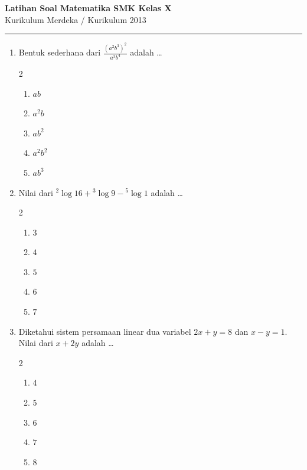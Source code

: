 \documentclass[12pt,a4paper]{article}
\begin{document}
\begin{center}
    \Large \textbf{\textsf{Latihan Soal Matematika SMK Kelas X}}\\
    \normalsize \textsf{Kurikulum Merdeka / Kurikulum 2013}
    \vspace{0.2cm}\\
    \rule{0.8\textwidth}{0.8pt}
\end{center}
\vspace{0.5cm}

\begin{enumerate}[itemsep=2ex]
    \item Bentuk sederhana dari $\displaystyle \frac{(a^2 b^3)^2}{a^3 b^4}$ adalah \dots
    \begin{multicols}{2}
    \begin{enumerate}[label=\Alph*.]
        \item $a b$
        \item $a^2 b$
        \item $a b^2$
        \item $a^2 b^2$
        \item $a b^3$
    \end{enumerate}
    \end{multicols}

    \item Nilai dari ${}^2\log 16 + {}^3\log 9 - {}^5\log 1$ adalah \dots
    \begin{multicols}{2}
    \begin{enumerate}[label=\Alph*.]
        \item $3$
        \item $4$
        \item $5$
        \item $6$
        \item $7$
    \end{enumerate}
    \end{multicols}

    \item Diketahui sistem persamaan linear dua variabel $2x + y = 8$ dan $x - y = 1$. Nilai dari $x + 2y$ adalah \dots
    \begin{multicols}{2}
    \begin{enumerate}[label=\Alph*.]
        \item $4$
        \item $5$
        \item $6$
        \item $7$
        \item $8$
    \end{enumerate}
    \end{multicols}


\end{enumerate}
\end{document}

